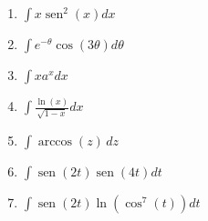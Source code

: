 \documentclass{article}
\begin{document}
\begin{multicols}{2}
\begin{enumerate}
    \item $\displaystyle \int x \operatorname{sen}^2 (x) dx$
    \item $\displaystyle \int e^{-\theta} \cos (3\theta) d\theta$
    \item $\displaystyle \int x a^x dx$
    \item $\displaystyle \int \frac{\ln (x)}{\sqrt{1 - x}} dx$
    \item $\displaystyle \int \operatorname{arccos} (z) \, dz$
    \item $\displaystyle \int \operatorname{sen} (2t) \operatorname{sen} (4t) dt$
    \item $\displaystyle \int \operatorname{sen} (2t) \ln (\cos^7 (t)) dt$
\end{enumerate}
\end{multicols}
\end{document}
